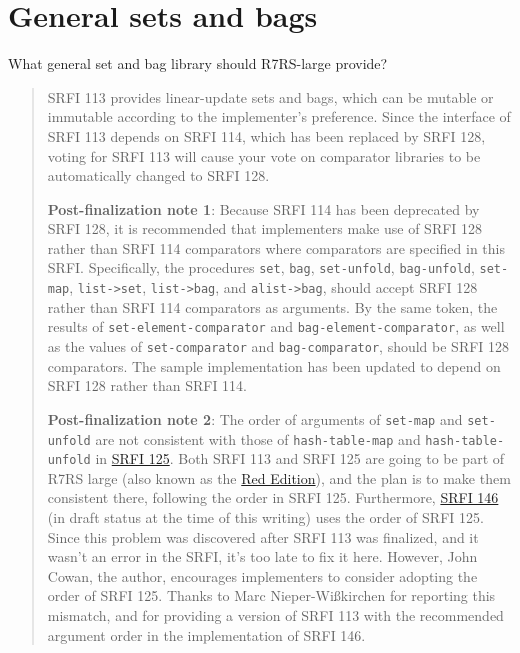 \section{General sets and bags}
 What general set and bag library should R7RS-large provide?

\begin{quote}
SRFI 113 provides linear-update sets and bags, which can be mutable or
immutable according to the implementer's preference. Since the interface
of SRFI 113 depends on SRFI 114, which has been replaced by SRFI 128,
voting for SRFI 113 will cause your vote on comparator libraries to be
automatically changed to SRFI 128.


\textbf{Post-finalization note 1}: Because SRFI 114 has been deprecated
by SRFI 128, it is recommended that implementers make use of SRFI 128
rather than SRFI 114 comparators where comparators are specified in this
SRFI. Specifically, the procedures \texttt{set}, \texttt{bag},
\texttt{set-unfold}, \texttt{bag-unfold}, \texttt{set-map},
\texttt{list-\textgreater{}set}, \texttt{list-\textgreater{}bag}, and
\texttt{alist-\textgreater{}bag}, should accept SRFI 128 rather than
SRFI 114 comparators as arguments. By the same token, the results of
\texttt{set-element-comparator} and \texttt{bag-element-comparator}, as
well as the values of \texttt{set-comparator} and
\texttt{bag-comparator}, should be SRFI 128 comparators. The sample
implementation has been updated to depend on SRFI 128 rather than SRFI
114.

\textbf{Post-finalization note 2}: The order of arguments of
\texttt{set-map} and \texttt{set-unfold} are not consistent with those
of \texttt{hash-table-map} and \texttt{hash-table-unfold} in
\href{https://srfi.schemers.org/srfi-125/}{SRFI 125}. Both SRFI 113 and
SRFI 125 are going to be part of R7RS large (also known as the
\href{http://trac.sacrideo.us/wg/wiki/RedEdition}{Red Edition}), and the
plan is to make them consistent there, following the order in SRFI 125.
Furthermore, \href{https://srfi.schemers.org/srfi-146/}{SRFI 146} (in
draft status at the time of this writing) uses the order of SRFI 125.
Since this problem was discovered after SRFI 113 was finalized, and it
wasn't an error in the SRFI, it's too late to fix it here. However, John
Cowan, the author, encourages implementers to consider adopting the
order of SRFI 125. Thanks to Marc Nieper-Wißkirchen for reporting this
mismatch, and for providing a version of SRFI 113 with the recommended
argument order in the implementation of SRFI 146.
\end{quote}


